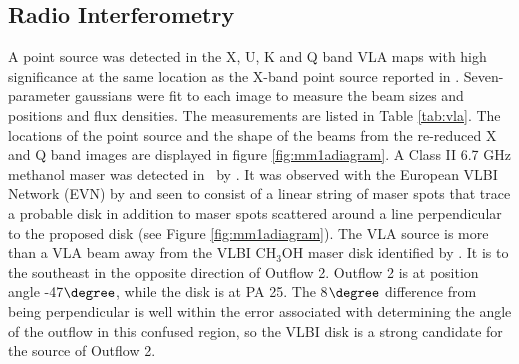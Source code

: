 


\subsection{Radio Interferometry}
\label{sec:vlaresults}
A point source was detected in the X, U, K and Q band VLA maps with high
significance at the same location as the X-band point source reported in
\citet{beuther2007}.  Seven-parameter gaussians were fit to each image to measure
the beam sizes and positions and flux densities.  The measurements are listed
in Table \ref{tab:vla}. The locations of the point source and the shape of the
beams from the re-reduced X and Q band images are displayed in figure
\ref{fig:mm1adiagram}. 
A Class II 6.7 GHz methanol maser was detected in \region\ by \citet{Menten1991}.
It was observed with the European VLBI Network (EVN) by \citet{Minier2000} and 
seen to consist of a linear string of maser spots that trace a probable disk in
addition to maser spots scattered around a line perpendicular to the proposed
disk (see Figure \ref{fig:mm1adiagram}).
The VLA source is more than a VLA beam away from the VLBI CH$_3$OH maser disk
identified by \citet{Minier2000}.  It is to the southeast in the opposite
direction of Outflow 2.  Outflow 2 is at position angle -47$\degree$, while the
disk is at PA 25\degree.  The 8$\degree$ difference from being perpendicular is
well within the error associated with determining the angle of the outflow in
this confused region, so the VLBI disk is a strong candidate for the source of Outflow 2.


\begin{figure*}[htpb]
  \caption{A diagram of the region surrounding mm1a from \citet{beuther2007}.
    The ellipses are centered at the measured source centers and their sizes
    represent the beam sizes of the Plateau de Bure interferometer at 1.2mm
    \citep[blue,][]{beuther2007}, Gemini MICHELLE at 7.9\um\
    \citep[red,][]{Longmore2006}, the VLA at 3.6cm (green), and the VLA at 7mm
    (orange). The maser disk was measured with the European VLBI Network by
    \citet{Minier2000}, so the size and direction of the disk are very well
    constrained.  The black circle is centered on the pointing center of the
    VLBI observation and represents the absolute pointing uncertainty.  The
    arrow pointing in the direction of Outflow 2 traces clumps along the
    outflow back to the mm emission region.  The vector is not to scale -
    Outflow 2 is about 45\arcsec\ long.
\label{fig:mm1adiagram}}
\end{figure*}


